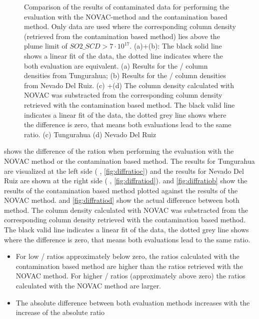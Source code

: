\documentclass  [
  paper    = a4,
  BCOR     = 10mm,
  twoside,
  fontsize = 12pt,
  fleqn,
  toc      = bibnumbered,
  toc      = listofnumbered,
  numbers  = noendperiod,
  headings = normal,
  listof   = leveldown,
  version  = 3.03
]                                       {scrreprt}
\begin{document}
\begin{figure}[h!]
{	\label{fig:diffratiod}}
	\caption{Comparison of the results of contaminated data for performing the evaluation with the NOVAC-method and the contamination based method. Only data are used where the corresponding   column density (retrieved from the contamination based method) lies above the plume limit of $SO2\_SCD>7\cdot 10^{17}$. (a)+(b): The black solid line shows a linear fit of the data, the dotted line indicates where the both evaluation are equivalent. (a) Results for the   /  column densities from Tungurahua; (b) Results for the   /  column densities from Nevado Del Ruiz. 
	(c) +(d) The column density calculated with NOVAC was substracted from the corresponding column density retrieved with the contamination based method. The black valid line indicates a linear fit of the data, the dotted grey line shows where the difference is zero, that means both evaluations lead to the same ratio. (c) Tungurahua (d) Nevado Del Ruiz}
	\label{fig:diffratio}
\end{figure}
 shows the difference of the ration when performing the evaluation with the NOVAC method or the contamination based method. The results for Tungurahua are visualized at the left side ( , \ref{fig:diffratioc}) and the results for Nevado Del Ruiz are shown at the right side  ( , \ref{fig:diffratiod}).  and \ref{fig:diffratiob} show the results of the contamination based method plotted against the results of the NOVAC method.   and \ref{fig:diffratiod} show the actual difference between both method. The column density calculated with NOVAC was substracted from the corresponding column density retrieved with the contamination based method. The black valid line indicates a linear fit of the data, the dotted grey line shows where the difference is zero, that means both evaluations lead to the same ratio.\\
\begin{itemize}
	\item For low /  ratios approximately below zero, the ratios calculated with the contamination based method are higher than the ratios retrieved with the NOVAC method. For higher /  ratios (approximately above zero) the ratios calculated with the NOVAC method are larger.
	\item The absolute difference between both evaluation methods increases with the increase of the absolute ratio
\end{itemize}
\end{document}
